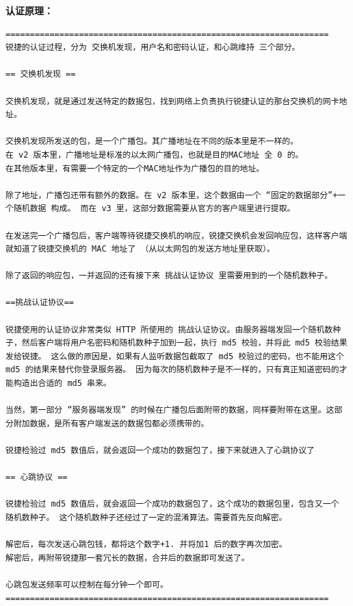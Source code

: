 \documentclass{itecreport-zh}
\begin{document}
\textbf{认证原理：}
\begin{verbatim}
==================================================================
锐捷的认证过程，分为 交换机发现，用户名和密码认证，和心跳维持 三个部分。

== 交换机发现 ==

交换机发现，就是通过发送特定的数据包，找到网络上负责执行锐捷认证的那台交换机的网卡地址。

交换机发现所发送的包，是一个广播包。其广播地址在不同的版本里是不一样的。
在 v2 版本里，广播地址是标准的以太网广播包，也就是目的MAC地址 全 0 的。
在其他版本里，有需要一个特定的一个MAC地址作为广播包的目的地址。

除了地址，广播包还带有额外的数据。在 v2 版本里，这个数据由一个 “固定的数据部分”+一个随机数据 构成。 而在 v3 里，这部分数据需要从官方的客户端里进行提取。

在发送完一个广播包后，客户端等待锐捷交换机的响应，锐捷交换机会发回响应包，这样客户端就知道了锐捷交换机的 MAC 地址了 （从以太网包的发送方地址里获取）。

除了返回的响应包，一并返回的还有接下来 挑战认证协议 里需要用到的一个随机数种子。

==挑战认证协议==

锐捷使用的认证协议非常类似 HTTP 所使用的 挑战认证协议。由服务器端发回一个随机数种子，然后客户端将用户名密码和随机数种子加到一起，执行 md5 校验，并将此 md5 校验结果发给锐捷。 这么做的原因是，如果有人监听数据包截取了 md5 校验过的密码，也不能用这个 md5 的结果来替代你登录服务器。 因为每次的随机数种子是不一样的，只有真正知道密码的才能构造出合适的 md5 串来。

当然，第一部分 “服务器端发现” 的时候在广播包后面附带的数据，同样要附带在这里。这部分附加数据，是所有客户端发送的数据包都必须携带的。

锐捷检验过 md5 数值后，就会返回一个成功的数据包了，接下来就进入了心跳协议了

== 心跳协议 ==

锐捷检验过 md5 数值后，就会返回一个成功的数据包了，这个成功的数据包里，包含又一个 随机数种子。 这个随机数种子还经过了一定的混淆算法。需要首先反向解密。

解密后，每次发送心跳包钱，都将这个数字+1. 并将加1 后的数字再次加密。
解密后，再附带锐捷那一套冗长的数据，合并后的数据即可发送了。

心跳包发送频率可以控制在每分钟一个即可。
==================================================================
\end{verbatim}
\end{document}
